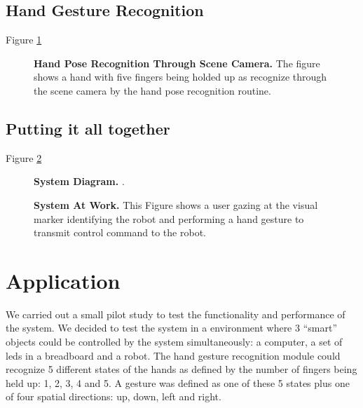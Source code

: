 \documentclass[jou,a4paper,notxfonts]{apa}
\begin{document}
\subsection{Hand Gesture Recognition}

Figure \ref{hand}

\begin{figure}[tp]
 \caption{\textbf{Hand Pose Recognition Through Scene Camera.} The figure shows a hand with five fingers being holded 
 up as recognize through the scene camera by the hand pose recognition routine.}
 \label{hand}
\end{figure}

\subsection{Putting it all together}
Figure \ref{systemDiagram}

\begin{figure}[tp]
 \caption{\textbf{System Diagram.} .}
 \label{systemDiagram}
\end{figure}


\begin{figure}[tp]
 \caption{\textbf{System At Work.} This Figure shows a user gazing at the visual marker identifying the robot and
 performing a hand gesture to transmit control command to the robot.}
 \label{systemAtWork}
\end{figure}

\section{Application}
We carried out a small pilot study to test the functionality and performance of the system. We decided to test the
system in a environment where 3 ``smart'' objects could be controlled by the system simultaneously: a computer, a set of
leds in a breadboard and a robot. The hand gesture recognition module could recognize 5 different states of the hands
as defined by the number of fingers being held up: 1, 2, 3, 4 and 5. A gesture was defined as one of these 5 states plus
one of four spatial directions: up, down, left and right.
\end{document}
